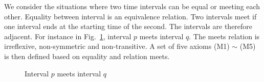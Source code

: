 \documentclass{llncs}
\begin{document}
We consider the situations where two time intervals can be equal or meeting each other. Equality between interval is an equivalence relation. Two intervals meet if one interval ends at the starting time of the second.  The intervals are therefore  adjacent. For instance in Fig.~\ref{fig:meets}, interval $p$ meets interval $q$. The meets relation is irreflexive, non-symmetric and non-transitive. A set of five axioms (M1) $\sim$ (M5) is then defined based on equality and relation meets. 
\begin{figure}[h]
\centering
{}
\caption{Interval $p$ meets interval $q$}
\label{fig:meets}
\end{figure}
\end{document}
